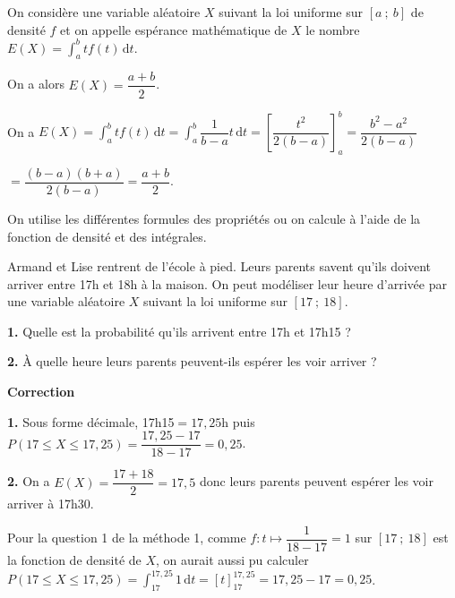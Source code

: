 \documentclass{cornouaille}
\begin{document}
\begin{propriete}
On considère une variable aléatoire $X$ suivant la loi uniforme sur $\left[a\ ;\ b \right]$ de densité $f$ et on appelle espérance mathématique de $X$ le nombre $E(X)=\displaystyle \int_{a}^{b} tf(t) \, \textrm{d}t$.

On a alors $E(X)=\dfrac{a+b}{2}$.
\end{propriete}



\begin{preuve}
On a $E(X)=\displaystyle \int_{a}^{b} tf(t) \, \textrm{d}t=\displaystyle \int_{a}^{b} \dfrac{1}{b-a} t \, \textrm{d}t=\left[\dfrac{t^2}{2(b-a)}\right]_a^b=\dfrac{b^2-a^2}{2(b-a)}$

$=\dfrac{(b-a)(b+a)}{2(b-a)}=\dfrac{a+b}{2}$.
\end{preuve}



\begin{methode}
On utilise les différentes formules des propriétés ou on calcule à l'aide de la fonction de densité et des intégrales.

\exercice
Armand et Lise rentrent de l'école à pied. Leurs parents savent qu'ils doivent arriver entre 17h et 18h à la maison. On peut modéliser leur heure d'arrivée par une variable aléatoire $X$ suivant la loi uniforme sur $\left[17\ ;\ 18 \right]$.




\textbf{1. } Quelle est la probabilité qu'ils arrivent entre 17h et 17h15 ?


\textbf{2. } \`A quelle heure leurs parents peuvent-ils \og{}espérer\fg{} les voir arriver ?



\textbf{Correction}





\textbf{1. } Sous forme décimale, 17h15$=17,25$h puis $P(17\leqslant X \leqslant 17,25)=\dfrac{17,25-17}{18-17}=0,25$.


\textbf{2. } On a $E(X)=\dfrac{17+18}{2}=17,5$ donc leurs parents peuvent espérer les voir arriver à 17h30.






\end{methode}



\begin{remarque}
Pour la question 1 de la méthode 1, comme ${f:t\mapsto \dfrac{1}{18-17}=1}$ sur $\left[17\ ;\ 18 \right]$ est la fonction de densité de $X$, on aurait aussi pu calculer ${P(17\leqslant X \leqslant 17,25)=\displaystyle \int_{17}^{17,25} 1 \, \textrm{d}t=\left[t\right]_{17}^{17,25}=17,25-17=0,25}$.
\end{remarque}
\end{document}
